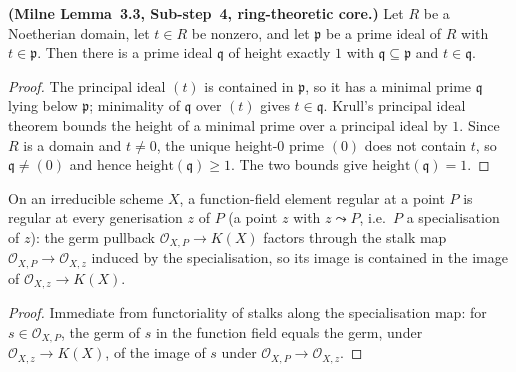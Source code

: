 \begin{lemma}
  \label{lem:krull_hauptidealsatz_transport}

  \textbf{(Milne Lemma~3.3, Sub-step~4, ring-theoretic core.)} Let \(R\) be a
  Noetherian domain, let \(t \in R\) be nonzero, and let \(\mathfrak p\) be a
  prime ideal of \(R\) with \(t \in \mathfrak p\). Then there is a prime ideal
  \(\mathfrak q\) of height exactly \(1\) with \(\mathfrak q \subseteq
  \mathfrak p\) and \(t \in \mathfrak q\).
\end{lemma}
\begin{proof}\leanok
  The principal ideal \((t)\) is contained in \(\mathfrak p\), so it has a
  minimal prime \(\mathfrak q\) lying below \(\mathfrak p\); minimality of
  \(\mathfrak q\) over \((t)\) gives \(t \in \mathfrak q\). Krull's principal
  ideal theorem bounds the height of a minimal prime over a principal ideal
  by \(1\). Since \(R\) is a domain and \(t \neq 0\), the unique height-\(0\)
  prime \((0)\) does not contain \(t\), so \(\mathfrak q \neq (0)\) and hence
  \(\mathrm{height}(\mathfrak q) \geq 1\). The two bounds give
  \(\mathrm{height}(\mathfrak q) = 1\).
\end{proof}

\begin{lemma}
  \label{lem:regular_stalk_propagates_to_generisation}

  On an irreducible scheme \(X\), a function-field element regular at a point
  \(P\) is regular at every generisation \(z\) of \(P\) (a point \(z\) with
  \(z \leadsto P\), i.e.\ \(P\) a specialisation of \(z\)): the germ pullback
  \(\mathcal O_{X,P} \to K(X)\) factors through the stalk map
  \(\mathcal O_{X,P} \to \mathcal O_{X,z}\) induced by the specialisation,
  so its image is contained in the image of \(\mathcal O_{X,z} \to K(X)\).
\end{lemma}
\begin{proof}\leanok
  Immediate from functoriality of stalks along the specialisation map: for
  \(s \in \mathcal O_{X,P}\), the germ of \(s\) in the function field equals
  the germ, under \(\mathcal O_{X,z} \to K(X)\), of the image of \(s\) under
  \(\mathcal O_{X,P} \to \mathcal O_{X,z}\).
\end{proof}

